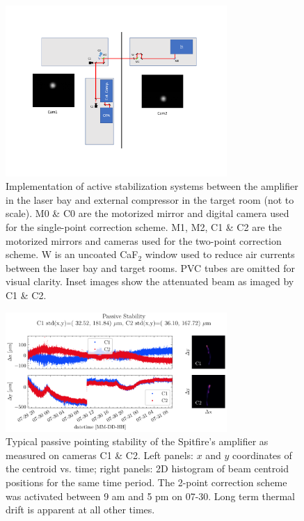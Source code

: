 \begin{figure}
	\centering
	\includegraphics[width=0.75\textwidth]{figures/chap2/guidestar_geometry.pdf}
	\caption{Implementation of active stabilization systems between the amplifier in the laser bay and external compressor in the target room (not to scale). M0 \& C0 are the motorized mirror and digital camera used for the single-point correction scheme. M1, M2, C1 \& C2 are the motorized mirrors and cameras used for the two-point correction scheme. W is an uncoated CaF$_2$ window used to reduce air currents between the laser bay and target rooms. PVC tubes are omitted for visual clarity. Inset images show the attenuated beam as imaged by C1 \& C2.}
	\label{fig:guidestar_geometry}
\end{figure}

\begin{figure}
	\centering
	\includegraphics[width=0.75\textwidth]{figures/chap2/Stability_NoCorrection.pdf}
	\caption{Typical passive pointing stability of the Spitfire's amplifier as measured on cameras C1 \& C2. Left panels: $x$ and $y$ coordinates of the centroid vs. time; right panels: 2D histogram of beam centroid positions for the same time period. The 2-point correction scheme was activated between 9 am and 5 pm on 07-30. Long term thermal drift is apparent at all other times.}
	\label{fig:guidestar_passive_stability}
\end{figure}

